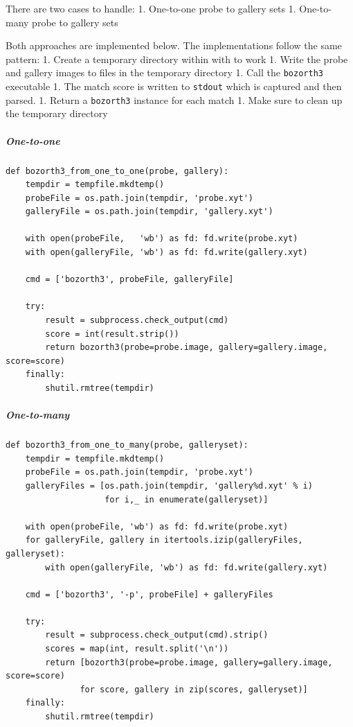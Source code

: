 There are two cases to handle: 1. One-to-one probe to gallery sets 1.
One-to-many probe to gallery sets

Both approaches are implemented below. The implementations follow the
same pattern: 1. Create a temporary directory within with to work 1.
Write the probe and gallery images to files in the temporary directory
1. Call the \texttt{bozorth3} executable 1. The match score is written
to \texttt{stdout} which is captured and then parsed. 1. Return a
\texttt{bozorth3} instance for each match 1. Make sure to clean up the
temporary directory

\subparagraph{One-to-one}\label{one-to-one}

\begin{verbatim}
def bozorth3_from_one_to_one(probe, gallery):
    tempdir = tempfile.mkdtemp()
    probeFile = os.path.join(tempdir, 'probe.xyt')
    galleryFile = os.path.join(tempdir, 'gallery.xyt')

    with open(probeFile,   'wb') as fd: fd.write(probe.xyt)
    with open(galleryFile, 'wb') as fd: fd.write(gallery.xyt)

    cmd = ['bozorth3', probeFile, galleryFile]

    try:
        result = subprocess.check_output(cmd)
        score = int(result.strip())
        return bozorth3(probe=probe.image, gallery=gallery.image, score=score)
    finally:
        shutil.rmtree(tempdir)
\end{verbatim}

\subparagraph{One-to-many}\label{one-to-many}

\begin{verbatim}
def bozorth3_from_one_to_many(probe, galleryset):
    tempdir = tempfile.mkdtemp()
    probeFile = os.path.join(tempdir, 'probe.xyt')
    galleryFiles = [os.path.join(tempdir, 'gallery%d.xyt' % i)
                    for i,_ in enumerate(galleryset)]

    with open(probeFile, 'wb') as fd: fd.write(probe.xyt)
    for galleryFile, gallery in itertools.izip(galleryFiles, galleryset):
        with open(galleryFile, 'wb') as fd: fd.write(gallery.xyt)

    cmd = ['bozorth3', '-p', probeFile] + galleryFiles

    try:
        result = subprocess.check_output(cmd).strip()
        scores = map(int, result.split('\n'))
        return [bozorth3(probe=probe.image, gallery=gallery.image, score=score)
               for score, gallery in zip(scores, galleryset)]
    finally:
        shutil.rmtree(tempdir)
\end{verbatim}

